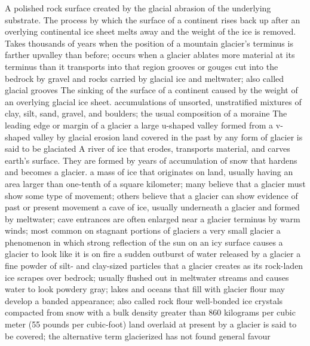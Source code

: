 A polished rock surface created by the glacial abrasion of the underlying substrate.
 The process by which the surface of a continent rises back up after an overlying continental ice sheet melts away and the weight of the ice is removed. Takes thousands of years
 when the position of a mountain glacier's terminus is farther upvalley than before; occurs when a glacier ablates more material at its terminus than it transports into that region
 grooves or gouges cut into the bedrock by gravel and rocks carried by glacial ice and meltwater; also called glacial grooves
 The sinking of the surface of a continent caused by the weight of an overlying glacial ice sheet.
 accumulations of unsorted, unstratified mixtures of clay, silt, sand, gravel, and boulders; the usual composition of a moraine
 The leading edge or margin of a glacier
 a large u-shaped valley formed from a v-shaped valley by glacial erosion
 land covered in the past by any form of glacier is said to be glaciated
 A river of ice that erodes, transports material, and carves earth's surface. They are formed by years of accumulation of snow that hardens and becomes a glacier.
 a mass of ice that originates on land, usually having an area larger than one-tenth of a square kilometer; many believe that a glacier must show some type of movement; others believe that a glacier can show evidence of past or present movement
 a cave of ice, usually underneath a glacier and formed by meltwater; cave entrances are often enlarged near a glacier terminus by warm winds; most common on stagnant portions of glaciers
 a very small glacier
 a phenomenon in which strong reflection of the sun on an icy surface causes a glacier to look like it is on fire
 a sudden outburst of water released by a glacier
 a fine powder of silt- and clay-sized particles that a glacier creates as its rock-laden ice scrapes over bedrock; usually flushed out in meltwater streams and causes water to look powdery gray; lakes and oceans that fill with glacier flour may develop a banded appearance; also called rock flour
 well-bonded ice crystals compacted from snow with a bulk density greater than 860 kilograms per cubic meter (55 pounds per cubic-foot)
 land overlaid at present by a glacier is said to be covered; the alternative term glacierized has not found general favour
